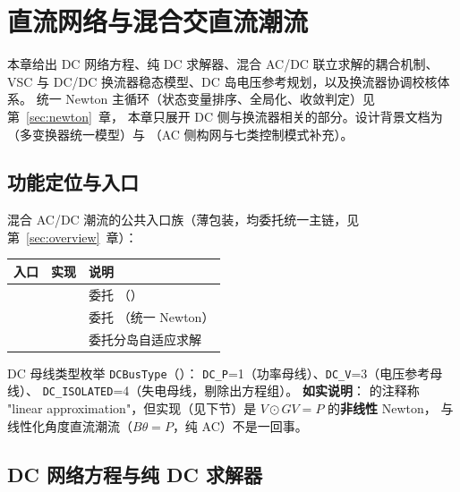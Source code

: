 \section{直流网络与混合交直流潮流}\label{sec:hybrid}

本章给出 DC 网络方程、纯 DC 求解器、混合 AC/DC 联立求解的耦合机制、
VSC 与 DC/DC 换流器稳态模型、DC 岛电压参考规划，以及换流器协调校核体系。
统一 Newton 主循环（状态变量排序、全局化、收敛判定）见第~\ref{sec:newton}~章，
本章只展开 DC 侧与换流器相关的部分。设计背景文档为
（多变换器统一模型）与
（AC 侧构网与七类控制模式补充）。

\subsection{功能定位与入口}

混合 AC/DC 潮流的公共入口族（薄包装，均委托统一主链，见第~\ref{sec:overview}~章）：

\begin{center}
\footnotesize
\begin{tabular}{@{}L{4.2cm}L{4.6cm}L{6.2cm}@{}}
\toprule
入口 & 实现 & 说明\\
\midrule
{} &  & 委托 （）\\
 &  & 委托 （统一 Newton）\\
 &  & 委托分岛自适应求解\\
\bottomrule
\end{tabular}
\end{center}

DC 母线类型枚举 \texttt{DCBusType}（）：
\texttt{DC\_P}=1（功率母线）、\texttt{DC\_V}=3（电压参考母线）、
\texttt{DC\_ISOLATED}=4（失电母线，剔除出方程组）。
\textbf{如实说明}： 的注释称
"linear approximation"，但实现（见下节）是 $V\odot GV=P$ 的\textbf{非线性} Newton，
与线性化角度直流潮流（$B\theta=P$，纯 AC）不是一回事。

\subsection{DC 网络方程与纯 DC 求解器}

